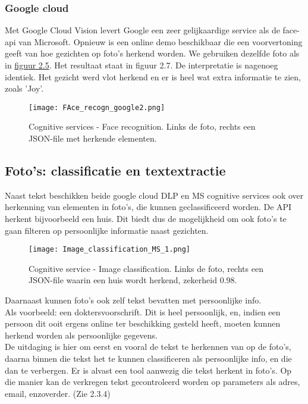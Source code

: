 \subsubsection{Google cloud}
Met Google Cloud Vision levert Google een zeer gelijkaardige service als de face-api van Microsoft. Opnieuw is een online demo beschikbaar die een voorvertoning geeft van hoe gezichten op foto's herkend worden. We gebruiken dezelfde foto als in \hyperref[fig:cognitive2]{figuur 2.5}. Het resultaat staat in figuur 2.7. De interpretatie is nagenoeg identiek. Het gezicht werd vlot herkend en er is heel wat extra informatie te zien, zoals 'Joy'. 

\begin{figure}[h]
	\texttt{[image: FAce\_recogn\_google2.png]}
	\caption{Cognitive services - Face recognition. Links de foto, rechts een JSON-file met herkende elementen.}
	\label{fig:facerecogn}
\end{figure}


\subsection{Foto's: classificatie en textextractie}
Naast tekst beschikken beide google cloud DLP en MS cognitive services ook over herkenning van elementen in foto's, die kunnen geclassificeerd worden. De API herkent bijvoorbeeld een huis. Dit biedt dus de mogelijkheid om ook foto's te gaan filteren op persoonlijke informatie naast gezichten. 


\begin{figure}[h]
	\texttt{[image: Image\_classification\_MS\_1.png]}
	\caption{Cognitive service - Image classification. Links de foto, rechts een JSON-file waarin een huis wordt herkend, zekerheid 0.98. }
	\label{fig:Houserecogn}
\end{figure}

Daarnaast kunnen foto's ook zelf tekst bevatten met persoonlijke info. 
\\ Als voorbeeld: een doktersvoorschrift. Dit is heel persoonlijk, en, indien een persoon dit ooit ergens online ter beschikking gesteld heeft, moeten kunnen herkend worden als persoonlijke gegevens. 
\\ De uitdaging is hier om eerst en vooral de tekst te herkennen van op de foto's, daarna binnen die tekst het te kunnen classificeren als persoonlijke info, en die dan te verbergen.
Er is alvast een tool aanwezig die tekst herkent in foto's. Op die manier kan  de verkregen tekst gecontroleerd worden op parameters als adres, email, enzoverder. (Zie 2.3.4)

